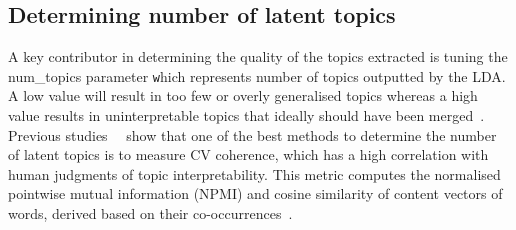     
    


\subsection{Determining number of latent topics}

A key contributor in determining the quality of the topics extracted is tuning the {num\_topics} parameter \texttt which represents number of topics outputted by the LDA. A low value will result in too few or overly generalised topics whereas a high value results in uninterpretable topics that ideally should have been merged~\cite{topic_score}. Previous studies~\cite{cv_abstract}~\cite{cv_space} show that one of the best methods to determine the number of latent topics is to measure CV coherence, which has a high correlation with human judgments of topic interpretability. This metric computes the normalised pointwise mutual information (NPMI) and cosine similarity of content vectors of words, derived based on their co-occurrences~\cite{cv_space}.

